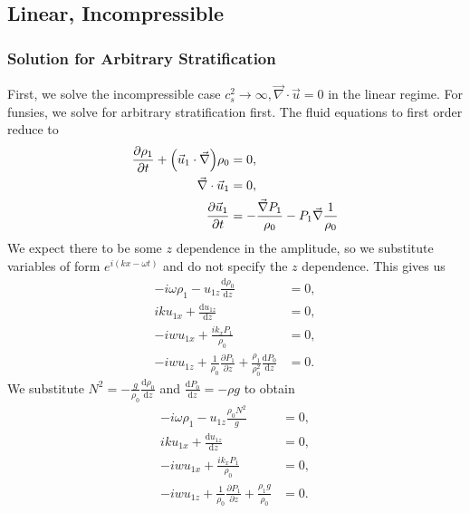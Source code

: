 \documentclass[11pt,
        usenames, %
        dvipsnames %
    ]{report}
\newcommand*{\rd}[2]{\frac{\mathrm{d}#1}{\mathrm{d}#2}}
\newcommand*{\pd}[2]{\frac{\partial#1}{\partial#2}}
\DeclarePairedDelimiter\p{\lparen}{\rparen}
\begin{document}
\subsection{Linear, Incompressible}

\subsubsection{Solution for Arbitrary Stratification}

First, we solve the incompressible case $c_s^2 \to \infty, \vec{\nabla} \cdot
\vec{u} = 0$ in the linear regime. For funsies, we solve for arbitrary
stratification first. The fluid equations to first order reduce to
\begin{equation}
    \begin{split}
        \pd{\rho_1}{t} + \p*{\vec{u}_1 \cdot \vec{\nabla}}\rho_0 &= 0,\\
        \vec{\nabla} \cdot \vec{u}_1 &= 0,\\
        \pd{\vec{u}_1}{t} &= -\frac{\vec{\nabla}P_1}{\rho_0}
            - P_1 \vec{\nabla}\frac{1}{\rho_0}
    \end{split}\label{eq:lin_incomp}
\end{equation}
We expect there to be some $z$ dependence in the amplitude, so we substitute
variables of form $e^{i(kx - \omega t)}$ and do not specify the $z$ dependence.
This gives us
\begin{equation}
    \begin{split}
        -i\omega \rho_1 - u_{1z}\rd{\rho_0}{z} &= 0,\\
        iku_{1x} + \rd{u_{1z}}{z} &= 0,\\
        -iw u_{1x} + \frac{ik_x P_1}{\rho_0} &= 0,\\
        -iw u_{1z} + \frac{1}{\rho_0}\pd{P_1}{z} +
            \frac{\rho_1}{\rho_0^2}\rd{P_0}{z} &= 0.
    \end{split}
\end{equation}
We substitute $N^2 = -\frac{g}{\rho_0}\rd{\rho_0}{z}$ and $\rd{P_0}{z} = -\rho
g$ to obtain
\begin{subequations}
    \begin{align}
        -i\omega \rho_1 - u_{1z}\frac{\rho_0N^2}{g} &= 0,\label{eq:lin.cont}\\
        iku_{1x} + \rd{u_{1z}}{z} &= 0,\label{eq:lin.div}\\
        -iw u_{1x} + \frac{ik_x P_1}{\rho_0} &= 0,\label{eq:lin.mom_x}\\
        -iw u_{1z} + \frac{1}{\rho_0}\pd{P_1}{z} +
            \frac{\rho_1g}{\rho_0} &= 0.\label{eq:lin.mom_z}
    \end{align}
\end{subequations}
\end{document}
